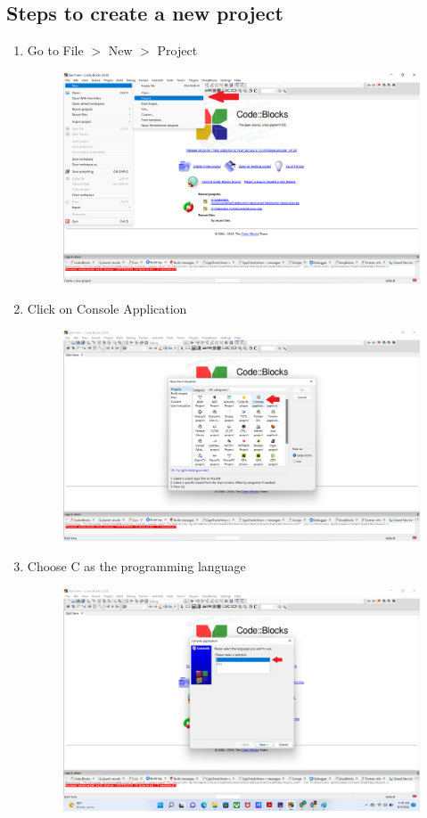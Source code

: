 \subsection{Steps to create a new project}
\begin{enumerate}
	\item Go to File $>$ New $>$ Project
	      \begin{figure}[H]
		      \centering
		      \includegraphics[width=0.7\linewidth]{P1/img/screenshot002.png}
		      \caption{}
		      \label{fig:screenshot002}
	      \end{figure}
	\item Click on Console Application
	      \begin{figure}[H]
		      \centering
		      \includegraphics[width=0.7\linewidth]{P1/img/screenshot004.png}
		      \caption{}
		      \label{fig:screenshot004}
	      \end{figure}
	\item Choose C as the programming language
	      \begin{figure}[H]
		      \centering
		      \includegraphics[width=0.7\linewidth]{P1/img/screenshot005.png}

\end{figure}
\end{enumerate}
